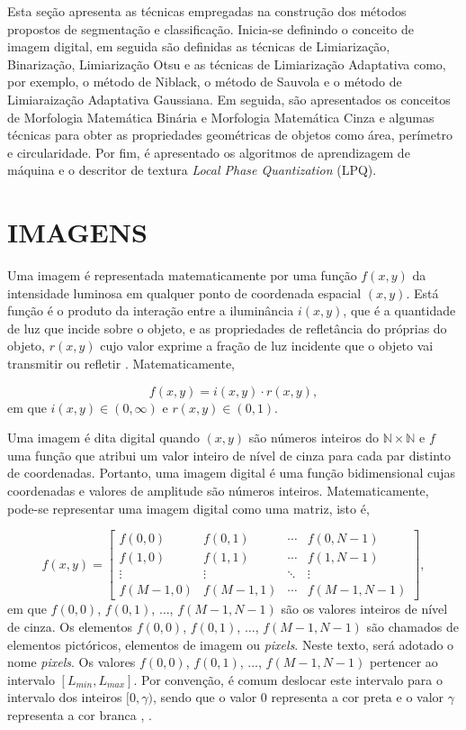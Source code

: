 Esta seção apresenta as técnicas empregadas na construção dos métodos propostos de segmentação e classificação. Inicia-se definindo o conceito de imagem digital, em seguida são definidas as técnicas de Limiarização, Binarização, Limiarização Otsu e as técnicas de Limiarização Adaptativa como, por exemplo, o método de Niblack, o método de Sauvola e o método de Limiaraização Adaptativa Gaussiana. Em seguida, são apresentados os conceitos de Morfologia Matemática Binária e Morfologia Matemática Cinza e algumas técnicas para obter as propriedades geométricas de objetos como área, perímetro e circularidade. Por fim, é apresentado os algoritmos de aprendizagem de máquina e o descritor de textura \textit{Local Phase Quantization} (LPQ).

\section{IMAGENS}

Uma imagem é representada matematicamente por uma função $f(x,y)$ da intensidade luminosa em qualquer ponto de coordenada espacial $(x,y)$. Está função é o produto da interação entre a iluminância $i(x,y)$, que é a quantidade de luz que incide sobre o objeto, e as propriedades de refletância do próprias do objeto, $r(x,y)$ cujo valor exprime a fração de luz incidente que o objeto vai transmitir ou refletir \cite{pddii}. Matematicamente,

\begin{equation}
	f(x,y) = i(x,y) \cdot r(x,y),
\end{equation}
em que $i(x,y) \in (0,\infty)$ e $r(x,y) \in (0,1)$.

Uma imagem é dita digital quando $(x,y)$ são números inteiros do $\mathbb{N} \times \mathbb{N}$ e $f$ uma função que atribui um valor inteiro de nível de cinza  para cada par distinto de coordenadas. Portanto, uma imagem digital é uma função bidimensional cujas coordenadas e valores de amplitude são números inteiros. Matematicamente, pode-se representar uma imagem digital como uma matriz, isto é, 

\begin{equation}
	f(x,y) = \begin{bmatrix}
		f(0,0) &   f(0,1) & \cdots & f(0,N-1) \\
		f(1,0) &   f(1,1) & \cdots & f(1,N-1) \\
		\vdots &   \vdots & \ddots & \vdots   \\
		f(M-1,0) & f(M-1,1) & \cdots & f(M-1,N-1)
	\end{bmatrix},
\end{equation}
em que $f(0,0)$, $f(0,1)$, $\dots$, $f(M-1,N-1)$ são os valores inteiros de nível de cinza. Os elementos  $f(0,0)$, $f(0,1)$, $\dots$, $f(M-1,N-1)$ são chamados de elementos pictóricos, elementos de imagem ou \textit{pixels}. Neste texto, será adotado o nome \textit{pixels}. Os valores $f(0,0)$, $f(0,1)$, $\dots$, $f(M-1,N-1)$ pertencer ao intervalo $[L_{min},L_{max}]$. Por convenção, é comum deslocar este intervalo para o intervalo dos inteiros $[0, \gamma)$, sendo que o valor $0$ representa a cor preta e o valor $\gamma$ representa a cor branca \cite{gonzalezprocessamento}, \cite{pddii}.

